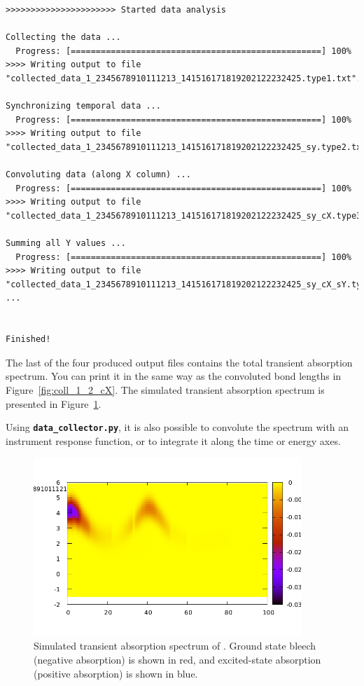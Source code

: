 \documentclass[a4paper,11pt,DIV=15,openany]{scrbook}
\newcommand{\ttt}[1]{\textbf{\texttt{#1}}}
\begin{document}
\begin{oframed}
\begin{Verbatim}[commandchars=\\\{\}]
>>>>>>>>>>>>>>>>>>>>>> Started data analysis

Collecting the data ...
  Progress: [==================================================] 100%
>>>> Writing output to file "collected_data_1_2345678910111213_141516171819202122232425.type1.txt"...

Synchronizing temporal data ...
  Progress: [==================================================] 100%
>>>> Writing output to file "collected_data_1_2345678910111213_141516171819202122232425_sy.type2.txt"...

Convoluting data (along X column) ...
  Progress: [==================================================] 100%
>>>> Writing output to file "collected_data_1_2345678910111213_141516171819202122232425_sy_cX.type3.txt"...

Summing all Y values ...
  Progress: [==================================================] 100%
>>>> Writing output to file "collected_data_1_2345678910111213_141516171819202122232425_sy_cX_sY.type3.txt"
...


Finished!
\end{Verbatim}
\end{oframed}

\normalsize
The last of the four produced output files contains the total transient absorption spectrum.
You can print it in the same way as the convoluted bond lengths in Figure~\ref{fig:coll_1_2_cX}.
The simulated transient absorption spectrum is presented in Figure~\ref{fig:TAS}.

Using \ttt{data\_collector.py}, it is also possible to convolute the spectrum with an instrument response function, or to integrate it along the time or energy axes.

\begin{figure}[h]
  \centering
  \includegraphics[width=0.9\textwidth]{figures/TAS.png}
  \caption{Simulated transient absorption spectrum of . Ground state bleech (negative absorption) is shown in red, and excited-state absorption (positive absorption) is shown in blue.}
  \label{fig:TAS}
\end{figure}
\end{document}
